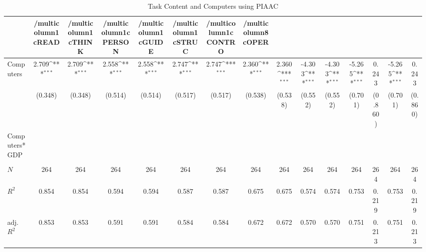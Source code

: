 \begin{table}[htbp]\centering
\def\sym#1{\ifmmode^{#1}\else\(^{#1}\)\fi}
\caption{Task Content and Computers using PIAAC}
\begin{tabular}{l*{14}{c}}
\hline\hline
            &/multicolumn{1}{c}{READ}&/multicolumn{1}{c}{THINK}&/multicolumn{1}{c}{PERSON}&/multicolumn{1}{c}{GUIDE}&/multicolumn{1}{c}{STRUC}&/multicolumn{1}{c}{CONTRO}&/multicolumn{8}{c}{OPER}                                                                                                                                                       \\
\hline
Computers   &       2.709\sym{***}&       2.709\sym{***}&       2.558\sym{***}&       2.558\sym{***}&       2.747\sym{***}&       2.747\sym{***}&       2.360\sym{***}&       2.360\sym{***}&      -4.303\sym{***}&      -4.303\sym{***}&      -5.265\sym{***}&       0.243         &      -5.265\sym{***}&       0.243         \\
            &     (0.348)         &     (0.348)         &     (0.514)         &     (0.514)         &     (0.517)         &     (0.517)         &     (0.538)         &     (0.538)         &     (0.552)         &     (0.552)         &     (0.701)         &     (0.860)         &     (0.701)         &     (0.860)         \\
[1em]
Computers*GDP&                     &                     &                     &                     &                     &                     &                     &                     &                     &                     &                     &                     &                     &                     \\
            &                     &                     &                     &                     &                     &                     &                     &                     &                     &                     &                     &                     &                     &                     \\
\hline
\(N\)       &         264         &         264         &         264         &         264         &         264         &         264         &         264         &         264         &         264         &         264         &         264         &         264         &         264         &         264         \\
\(R^{2}\)   &       0.854         &       0.854         &       0.594         &       0.594         &       0.587         &       0.587         &       0.675         &       0.675         &       0.574         &       0.574         &       0.753         &       0.219         &       0.753         &       0.219         \\
adj. \(R^{2}\)&       0.853         &       0.853         &       0.591         &       0.591         &       0.584         &       0.584         &       0.672         &       0.672         &       0.570         &       0.570         &       0.751         &       0.213         &       0.751         &       0.213         \\
\hline\hline
\end{tabular}
\end{table}
